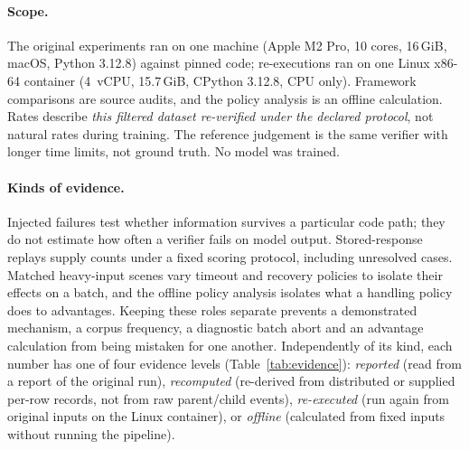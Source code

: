 \documentclass[10pt,a4paper]{article}
\begin{document}
\paragraph{Scope.}
The original experiments ran on one machine (Apple M2 Pro, 10 cores,
16\,GiB, macOS, Python 3.12.8) against pinned code; re-executions ran on one
Linux x86-64 container (4~vCPU, 15.7\,GiB, CPython 3.12.8, CPU only).
Framework comparisons are source audits, and the policy analysis is an
offline calculation. Rates describe
\emph{this filtered dataset re-verified under the declared protocol}, not
natural rates during training. The reference judgement is the same verifier
with longer time limits, not ground truth. No model was trained.

\paragraph{Kinds of evidence.}
Injected failures test whether information survives a particular code
path; they do not estimate how often a verifier fails on model output.
Stored-response replays supply counts under a fixed scoring protocol,
including unresolved cases. Matched heavy-input scenes vary timeout and
recovery policies to isolate their effects on a batch, and the offline
policy analysis isolates what a handling policy does to advantages. Keeping
these roles separate prevents a demonstrated mechanism, a corpus frequency,
a diagnostic batch abort and an advantage calculation from being mistaken
for one another. Independently of its kind, each number has one of four
evidence levels (Table~\ref{tab:evidence}): \emph{reported} (read from a
report of the original run), \emph{recomputed} (re-derived from distributed
or supplied per-row records, not from raw parent/child events),
\emph{re-executed} (run again from original inputs on the Linux container),
or \emph{offline} (calculated from fixed inputs without running the
pipeline).
\end{document}
